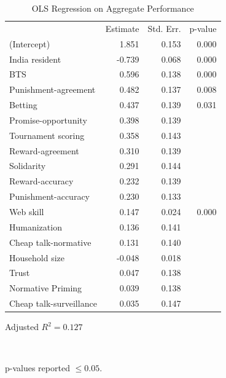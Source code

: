 \documentclass{cscw2010}
\begin{document}
\begin{table}[ht]					%
\begin{center}						%
\caption{OLS Regression on Aggregate Performance} %
\vspace{8pt}
\begin{threeparttable}
\begin{tabular}{@{}l r  r r@{}}
\toprule
 & Estimate & Std. Err. & p-value\tnote{\dag}\\
\cmidrule(l){2-4}
(Intercept) & 1.851 & 0.153 & 0.000\\
India resident & -0.739 & 0.068 & 0.000\\
BTS & 0.596 & 0.138 & 0.000\\
Punishment-agreement & 0.482 & 0.137 & 0.008\\
Betting & 0.437 & 0.139 & 0.031\\
Promise-opportunity & 0.398 & 0.139 &\\
Tournament scoring & 0.358 & 0.143 &\\
Reward-agreement & 0.310 & 0.139 &\\
Solidarity & 0.291 & 0.144 &\\
Reward-accuracy & 0.232 & 0.139 &\\
Punishment-accuracy & 0.230 & 0.133 &\\
Web skill & 0.147 & 0.024 & 0.000\\
Humanization & 0.136 & 0.141 &\\
Cheap talk-normative & 0.131 & 0.140 &\\
Household size  & -0.048 & 0.018 &\\
Trust & 0.047 & 0.138 &\\
Normative Priming & 0.039 & 0.138 &\\
Cheap talk-surveillance & 0.035 & 0.147 &\\
\bottomrule
\end{tabular}
  \begin{tablenotes}[para]
	\small{\item Adjusted $R^{2} = 0.127$}\\
	\item[\dag]p-values reported $\leq 0.05$.\\
  \end{tablenotes}
\end{threeparttable}
\label{table:demog_control_model}
\end{center}
\end{table}
\end{document}
